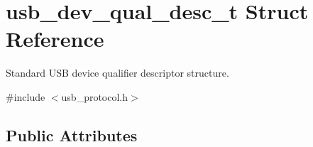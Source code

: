 \hypertarget{structusb__dev__qual__desc__t}{\section{usb\-\_\-dev\-\_\-qual\-\_\-desc\-\_\-t Struct Reference}
\label{structusb__dev__qual__desc__t}
}


Standard U\-S\-B device qualifier descriptor structure.  




{\ttfamily \#include $<$usb\-\_\-protocol.\-h$>$}

\subsection*{Public Attributes}
